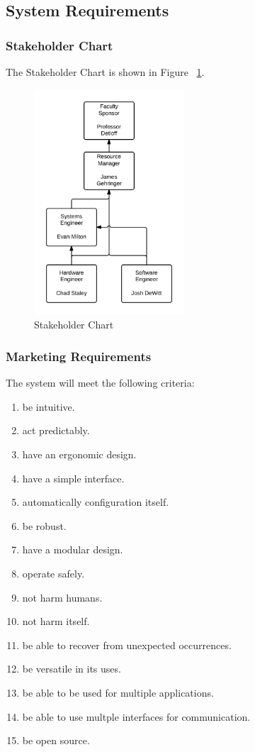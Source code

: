 \documentclass[11pt]{report}
\begin{document}
\subsection{System Requirements}
\subsubsection{Stakeholder Chart}
The Stakeholder Chart is shown in Figure ~\ref{fig:organization}.
\begin{figure}[p]
	\centering
	\includegraphics[width=0.5\textwidth]{organization.png}
	\caption{Stakeholder Chart}
	\label{fig:organization}
\end{figure}

\subsubsection{Marketing Requirements}
The system will meet the following criteria:
\begin{enumerate} \parskip2pt
	\item be intuitive.
	\item act predictably.
	\item have an ergonomic design.
	\item have a simple interface.
	\item automatically configuration itself.
	\item be robust.
	\item have a modular design.
	\item operate safely.
	\item not harm humans.
	\item not harm itself.
	\item be able to recover from unexpected occurrences.
	\item be versatile in its uses.
	\item be able to be used for multiple applications.
	\item be able to use multple interfaces for communication.
	\item be open source.
\end{enumerate}
\end{document}
